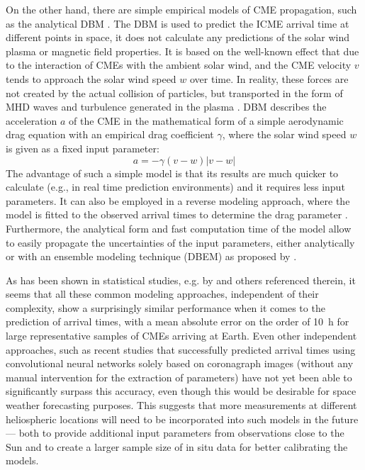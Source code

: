 On the other hand, there are simple empirical models of CME propagation, such as the analytical \acl{DBM} \citep[\acs{DBM},][]{Vrsnak-2013}. The \ac{DBM} is used to predict the \ac{ICME} arrival time at different points in space, it does not calculate any predictions of the solar wind plasma or magnetic field properties. It is based on the well-known effect that due to the interaction of \acp{CME} with the ambient solar wind, and the \ac{CME} velocity $v$ tends to approach the solar wind speed $w$ over time. In reality, these forces are not created by the actual collision of particles, but transported in the form of \ac{MHD} waves and turbulence generated in the plasma \citep[see e.g.][for details]{Cargill-1996,Owens-2004}. \ac{DBM} describes the acceleration $a$ of the \ac{CME} in the mathematical form of a simple aerodynamic drag equation with an empirical drag coefficient $\gamma$, where the solar wind speed $w$ is given as a fixed input parameter:
\begin{equation}
    a = -\gamma (v-w) |v-w|
\end{equation}
The advantage of such a simple model is that its results are much quicker to calculate (e.g., in real time prediction environments) and it requires less input parameters. It can also be employed in a reverse modeling approach, where the model is fitted to the observed arrival times to determine the drag parameter \citep{Zic-2015}. Furthermore, the analytical form and fast computation time of the model allow to easily propagate the uncertainties of the input parameters, either analytically or with an ensemble modeling technique (DBEM) as proposed by \citet{Dumbovic-2018}.

As has been shown in statistical studies, e.g. by \citet{Vrsnak-2014,Dumbovic-2018} and others referenced therein, it seems that all these common modeling approaches, independent of their complexity, show a surprisingly similar performance when it comes to the prediction of arrival times, with a mean absolute error on the order of \SI{10}{\hour} for large representative samples of \acp{CME} arriving at Earth. Even other independent approaches, such as recent studies that successfully predicted arrival times using convolutional neural networks solely based on coronagraph images (without any manual intervention for the extraction of parameters) \citep{Wang-2019} have not yet been able to significantly surpass this accuracy, even though this would be desirable for space weather forecasting purposes. This suggests that more measurements at different heliospheric locations will need to be incorporated into such models in the future --- both to provide additional input parameters from observations close to the Sun and to create a larger sample size of in situ data for better calibrating the models.

